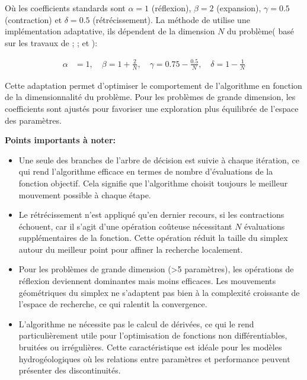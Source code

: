 Où les coefficients standards sont $\alpha = 1$ (réflexion), $\beta = 2$ (expansion), $\gamma = 0.5$ (contraction) et $\delta = 0.5$ (rétrécissement). La méthode  de  utilise une implémentation adaptative, ils dépendent de la dimension $N$ du problème( basé sur les travaux de \cite{nelderSimplexMethodFunction1965}; \cite{lagariasConvergencePropertiesNelderMead1998}; et \cite{gaoImplementingNelderMeadSimplex2012}):

\begin{align}
\alpha &= 1, \quad \beta = 1 + \frac{2}{N}, \quad \gamma = 0.75 - \frac{0.5}{N}, \quad \delta = 1 - \frac{1}{N}
\end{align}

Cette adaptation permet d'optimiser le comportement de l'algorithme en fonction de la dimensionnalité du problème. Pour les problèmes de grande dimension, les coefficients sont ajustés pour favoriser une exploration plus équilibrée de l'espace des paramètres.

\vspace{1em}

\begin{InfoBox}
    \noindent\textbf{Points importants à noter:}
        \begin{itemize}[leftmargin=1cm]
            \item Une seule des branches de l'arbre de décision est suivie à chaque itération, ce qui rend l'algorithme efficace en termes de nombre d'évaluations de la fonction objectif. Cela signifie que l'algorithme choisit toujours le meilleur mouvement possible à chaque étape.
            
            \item Le rétrécissement n'est appliqué qu'en dernier recours, si les contractions échouent, car il s'agit d'une opération coûteuse nécessitant $N$ évaluations supplémentaires de la fonction. Cette opération réduit la taille du simplex autour du meilleur point pour affiner la recherche localement.
            
            \item Pour les problèmes de grande dimension (>5 paramètres), les opérations de réflexion deviennent dominantes mais moins efficaces. Les mouvements géométriques du simplex ne s'adaptent pas bien à la complexité croissante de l'espace de recherche, ce qui ralentit la convergence.
            
            \item L'algorithme ne nécessite pas le calcul de dérivées, ce qui le rend particulièrement utile pour l'optimisation de fonctions non différentiables, bruitées ou irrégulières. Cette caractéristique est idéale pour les modèles hydrogéologiques où les relations entre paramètres et performance peuvent présenter des discontinuités.
        \end{itemize}
\end{InfoBox}


